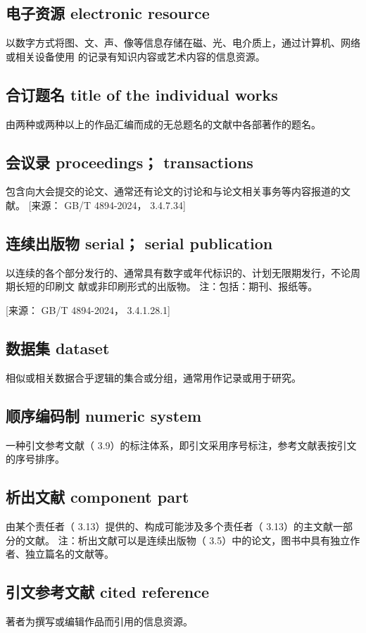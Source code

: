 \documentclass{article}
\begin{document}
\subsection{电子资源 electronic resource}
以数字方式将图、文、声、像等信息存储在磁、光、电介质上，通过计算机、网络或相关设备使用
的记录有知识内容或艺术内容的信息资源。

\subsection{合订题名 title of the individual works}
由两种或两种以上的作品汇编而成的无总题名的文献中各部著作的题名。

\subsection{会议录 proceedings； transactions}
包含向大会提交的论文、通常还有论文的讨论和与论文相关事务等内容报道的文献。
[来源： GB/T 4894-2024， 3.4.7.34]

\subsection{连续出版物 serial； serial publication}
以连续的各个部分发行的、通常具有数字或年代标识的、计划无限期发行，不论周期长短的印刷文
献或非印刷形式的出版物。
注：包括：期刊、报纸等。

[来源： GB/T 4894-2024， 3.4.1.28.1]

\subsection{数据集 dataset}
相似或相关数据合乎逻辑的集合或分组，通常用作记录或用于研究。

\subsection{顺序编码制 numeric system}
一种引文参考文献（ 3.9）的标注体系，即引文采用序号标注，参考文献表按引文的序号排序。

\subsection{析出文献 component part}
由某个责任者（ 3.13）提供的、构成可能涉及多个责任者（ 3.13）的主文献一部分的文献。
注：析出文献可以是连续出版物（ 3.5）中的论文，图书中具有独立作者、独立篇名的文献等。

\subsection{引文参考文献 cited reference}
著者为撰写或编辑作品而引用的信息资源。
\end{document}
